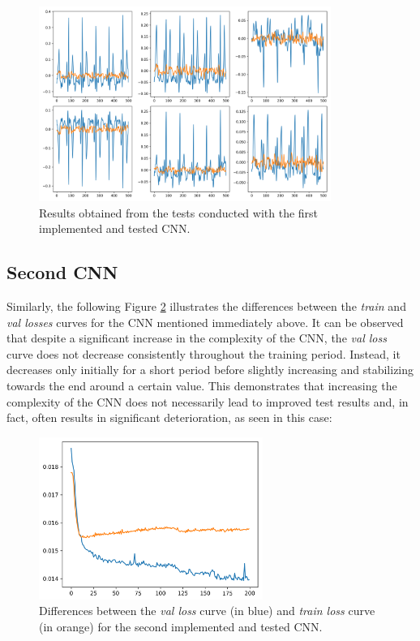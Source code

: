\documentclass[12pt,italian]{report}
\begin{document}
\begin{figure}[H]
    \centering
    \includegraphics[width=0.85\textwidth]{images/first_cnn_second_plot.png}
    \captionsetup{justification=centering}
    \caption{Results obtained from the tests conducted with the first implemented and tested CNN.}
    \label{fig:first_cnn_second_plot}
\end{figure}


\subsection{Second CNN}
\label{subsec:second_cnn_results}

Similarly, the following Figure \ref{fig:second_cnn_first_plot} illustrates the differences between the \textit{train} and \textit{val losses} curves for the CNN mentioned immediately above. It can be observed that despite a significant increase in the complexity of the CNN, the \textit{val loss} curve does not decrease consistently throughout the training period. Instead, it decreases only initially for a short period before slightly increasing and stabilizing towards the end around a certain value. This demonstrates that increasing the complexity of the CNN does not necessarily lead to improved test results and, in fact, often results in significant deterioration, as seen in this case:

\begin{figure}[H]
    \centering
    \includegraphics[width=0.65\textwidth]{images/second_cnn_first_plot.png}
    \captionsetup{justification=centering}
    \caption{Differences between the \textit{val loss} curve (in blue) and \textit{train loss} curve (in orange) for the second implemented and tested CNN.}
    \label{fig:second_cnn_first_plot}
\end{figure}
\end{document}
